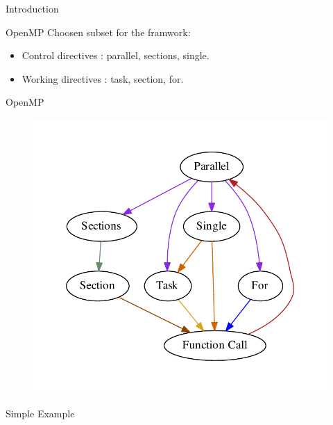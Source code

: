 \documentclass[xcolor=dvipsnames]{beamer}
\begin{document}
\begin{section}{Introduction}
\begin{frame}{\hskip 0.3cm OpenMP }
Choosen subset for the framwork:

\begin{itemize}

\item Control directives : parallel, sections, single.

\item Working directives : task, section, for.

\end{itemize}

\end{frame}












\begin{frame}{\hskip 0.3cm OpenMP}

\begin{figure}
\centering
\includegraphics[scale = 0.45]{ompstructure}

\end{figure}

\end{frame}


\begin{frame}[fragile]{\hskip 0.3cm Simple Example}

\begin{columns}


\end{columns}
\end{frame}
\end{section}
\end{document}
